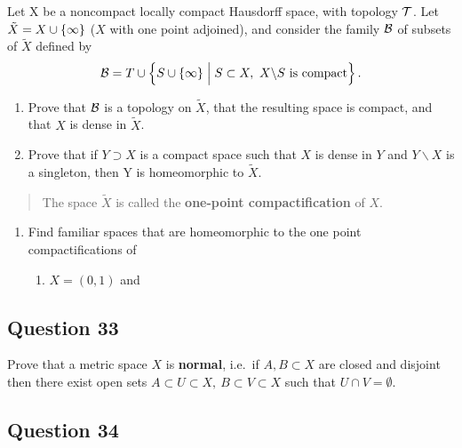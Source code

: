 \documentclass[12pt]{article}
\providecommand{\tightlist}{%
  \setlength{\itemsep}{0pt}\setlength{\parskip}{0pt}}
\begin{document}
Let X be a noncompact locally compact Hausdorff space, with topology
\({\mathcal{T}}\). Let \(\tilde X = X \cup \left\{{\infty}\right\}\) (\(X\) with one
point adjoined), and consider the family \({\mathcal{B}}\) of subsets of
\(\tilde X\) defined by \[
{\mathcal{B}} = T \cup \left\{{S \cup \left\{{\infty}\right\}\mathrel{\Big|} S \subset X,~~ X \backslash S \text{ is compact}}\right\}
.\]

\begin{enumerate}
\def\labelenumi{\alph{enumi}.}
\item
  Prove that \({\mathcal{B}}\) is a topology on \(\tilde X\), that the resulting
  space is compact, and that \(X\) is dense in \(\tilde X\).
\item
  Prove that if \(Y \supset X\) is a compact space such that \(X\) is
  dense in \(Y\) and \(Y \backslash X\) is a singleton, then Y is
  homeomorphic to \(\tilde X\).
\end{enumerate}

\begin{quote}
The space \(\tilde X\) is called the \textbf{one-point compactification}
of \(X\).
\end{quote}

\begin{enumerate}
\def\labelenumi{\alph{enumi}.}
\setcounter{enumi}{2}
\item
  Find familiar spaces that are homeomorphic to the one point
  compactifications of

  \begin{enumerate}
  \def\labelenumii{\roman{enumii}.}
  \tightlist
  \item
    \(X = (0, 1)\) and
  \end{enumerate}
\end{enumerate}

\hypertarget{question-33-3}{%
\subsection{Question 33}\label{question-33-3}}

Prove that a metric space \(X\) is \textbf{normal}, i.e.~if
\(A, B \subset X\) are closed and disjoint then there exist open sets
\(A \subset U \subset X, ~B \subset V \subset X\) such that
\(U \cap V = \emptyset\).

\hypertarget{question-34-3}{%
\subsection{Question 34}\label{question-34-3}}
\end{document}
